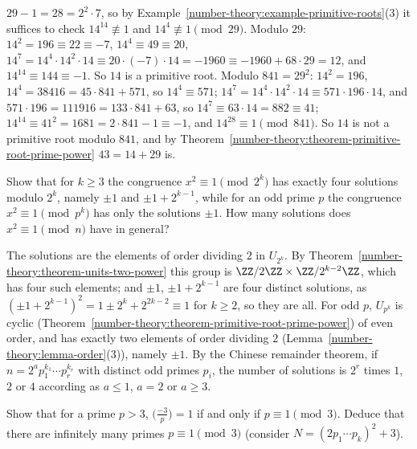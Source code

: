 \begin{solution}
$29 - 1 = 28 = 2^2 \cdot 7$, so by Example~\ref{number-theory:example-primitive-roots}(3) it suffices to check $14^{14} \not\equiv 1$ and $14^4 \not\equiv 1 \pmod{29}$. Modulo $29$: $14^2 = 196 \equiv 22 \equiv -7$,
$14^4 \equiv 49 \equiv 20$, $14^7 = 14^4 \cdot 14^2 \cdot 14 \equiv 20 \cdot (-7) \cdot 14 = -1960 \equiv -1960 + 68 \cdot 29 = 12$, and $14^{14} \equiv 144 \equiv -1$. So $14$ is a primitive root. Modulo
$841 = 29^2$: $14^2 = 196$, $14^4 = 38416 = 45 \cdot 841 + 571$, so $14^4 \equiv 571$; $14^7 = 14^4 \cdot 14^2 \cdot 14 \equiv 571 \cdot 196 \cdot 14$, and $571 \cdot 196 = 111916 = 133 \cdot 841 + 63$, so
$14^7 \equiv 63 \cdot 14 = 882 \equiv 41$; $14^{14} \equiv 41^2 = 1681 = 2 \cdot 841 - 1 \equiv -1$, and $14^{28} \equiv 1 \pmod{841}$. So $14$ is not a primitive root modulo $841$, and by
Theorem~\ref{number-theory:theorem-primitive-root-prime-power} $43 = 14 + 29$ is.
\end{solution}

\begin{exercise}\label{number-theory:exercise-square-roots-one}
Show that for $k \geq 3$ the congruence $x^2 \equiv 1 \pmod{2^k}$ has exactly four solutions modulo $2^k$, namely $\pm1$ and $\pm1 + 2^{k-1}$, while for an odd prime $p$ the congruence
$x^2 \equiv 1 \pmod{p^k}$ has only the solutions $\pm1$. How many solutions does $x^2 \equiv 1 \pmod n$ have in general?
\end{exercise}

\begin{solution}
The solutions are the elements of order dividing $2$ in $U_{2^k}$. By Theorem~\ref{number-theory:theorem-units-two-power} this group is $\ZZ/2\ZZ \times \ZZ/2^{k-2}\ZZ$, which has four such elements; and
$\pm1$, $\pm1 + 2^{k-1}$ are four distinct solutions, as $(\pm1 + 2^{k-1})^2 = 1 \pm 2^k + 2^{2k-2} \equiv 1$ for $k \geq 2$, so they are all. For odd $p$, $U_{p^k}$ is cyclic
(Theorem~\ref{number-theory:theorem-primitive-root-prime-power}) of even order, and has exactly two elements of order dividing $2$ (Lemma~\ref{number-theory:lemma-order}(3)), namely $\pm1$. By the Chinese
remainder theorem, if $n = 2^ap_1^{k_1} \cdots p_r^{k_r}$ with distinct odd primes $p_i$, the number of solutions is $2^r$ times $1$, $2$ or $4$ according as $a \leq 1$, $a = 2$ or $a \geq 3$.
\end{solution}

\begin{exercise}\label{number-theory:exercise-minus-three}
Show that for a prime $p > 3$, $\bigl(\frac{-3}{p}\bigr) = 1$ if and only if $p \equiv 1 \pmod 3$. Deduce that there are infinitely many primes $p \equiv 1 \pmod 3$ (consider
$N = (2p_1 \cdots p_k)^2 + 3$).
\end{exercise}

